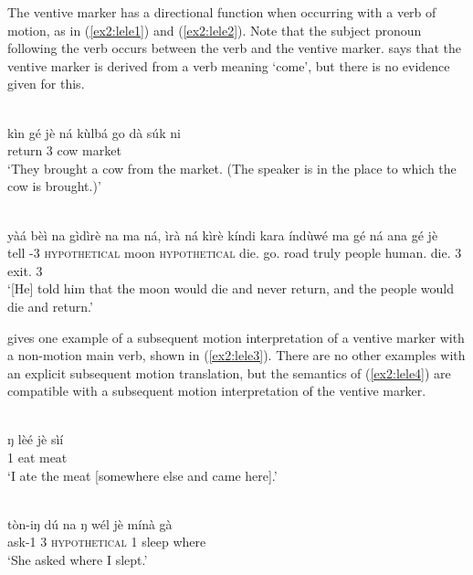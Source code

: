 The ventive marker has a directional function when occurring with a verb of motion, as in (\ref{ex2:lele1}) and (\ref{ex2:lele2}). Note that the subject pronoun following the verb occurs between the verb and the ventive marker. \citet[196]{frajzyngierGrammarLele2001} says that the ventive marker is derived from a verb meaning `come’, but there is no evidence given for this. 

\ea\label{ex2:lele1}
 \\
\gll kìn gé jè ná kùlbá go dà súk ni	\\
return 3   cow   market  \\
\glt `They brought a cow from the market. (The speaker is in the place to which the cow is brought.)'

\ex\label{ex2:lele2}
 \\
\gll yàá bèì na gìdìrè na ma ná, ìrà ná kìrè kíndi kara índùwé ma gé ná ana gé jè \\
tell -3 \textsc{hypothetical} moon \textsc{hypothetical} die.  go.  road truly people human. die. 3  exit. 3 	\\
\glt `[He] told him that the moon would die and never return, and the people would die and return.'
\z

\citet[194]{frajzyngierGrammarLele2001} gives one example of a subsequent motion interpretation of a ventive marker with a non-motion main verb, shown in (\ref{ex2:lele3}). There are no other examples with an explicit subsequent motion translation, but the semantics of (\ref{ex2:lele4}) are compatible with a subsequent motion interpretation of the ventive marker. 

\ea\label{ex2:lele3}
 \\
\gll ŋ	lèé	jè	sìí \\
1	eat		meat \\
\glt `I ate the meat [somewhere else and came here].'

\ex\label{ex2:lele4}
 \\
\gll tòn-iŋ	dú	na	ŋ	wél	jè	mínà	gà \\
ask-1	3	\textsc{hypothetical}	1	sleep		where	 \\
\glt `She asked where I slept.'
\z 


